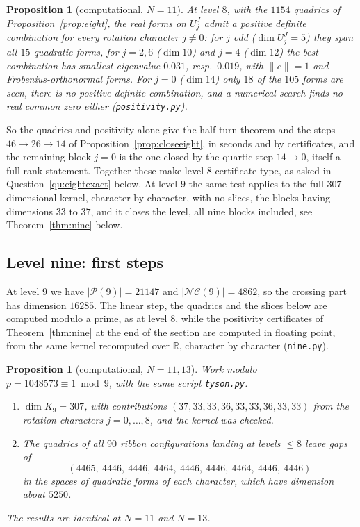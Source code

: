 \documentclass[11pt]{amsart}
\newtheorem{proposition}[theorem]{Proposition}
\theoremstyle{definition}
\theoremstyle{remark}
\theoremstyle{plain}
\numberwithin{equation}{section}
\numberwithin{table}{section}
\newcommand{\NC}{\mathcal{NC}}
\newcommand{\Pp}{\mathcal{P}}
\begin{document}
\begin{proposition}[computational, $N=11$]\label{prop:poseight}
At level $8$, with the $1154$ quadrics of Proposition~\ref{prop:eight}, the real forms on $U_j^J$ admit a positive definite combination for every rotation character $j\ne0$: for $j$ odd ($\dim U_j^J=5$) they span all $15$ quadratic forms, for $j=2,6$ ($\dim10$) and $j=4$ ($\dim12$) the best combination has smallest eigenvalue $0.031$, resp.\ $0.019$, with $\|c\|=1$ and Frobenius-orthonormal forms. For $j=0$ ($\dim14$) only $18$ of the $105$ forms are seen, there is no positive definite combination, and a numerical search finds no real common zero either (\texttt{positivity.py}).
\end{proposition}

So the quadrics and positivity alone give the half-turn theorem and the steps $46\to26\to14$ of Proposition~\ref{prop:closeeight}, in seconds and by certificates, and the remaining block $j=0$ is the one closed by the quartic step $14\to0$, itself a full-rank statement. Together these make level $8$ certificate-type, as asked in Question~\ref{qu:eightexact} below. At level $9$ the same test applies to the full $307$-dimensional kernel, character by character, with no slices, the blocks having dimensions $33$ to $37$, and it closes the level, all nine blocks included, see Theorem~\ref{thm:nine} below.

\subsection{Level nine: first steps}

At level $9$ we have $|\Pp(9)|=21147$ and $|\NC(9)|=4862$, so the crossing part has dimension $16285$. The linear step, the quadrics and the slices below are computed modulo a prime, as at level $8$, while the positivity certificates of Theorem~\ref{thm:nine} at the end of the section are computed in floating point, from the same kernel recomputed over $\mathbb R$, character by character (\texttt{nine.py}).

\begin{proposition}[computational, $N=11,13$]\label{prop:nine}
Work modulo $p=1048573\equiv1\bmod9$, with the same script \texttt{tyson.py}.
\begin{enumerate}
\item $\dim K_9=307$, with contributions $(37,33,33,36,33,33,36,33,33)$ from the rotation characters $j=0,\dots,8$, and the kernel was checked.
\item The quadrics of all $90$ ribbon configurations landing at levels $\le8$ leave gaps of
\[
(4465,\ 4446,\ 4446,\ 4464,\ 4446,\ 4446,\ 4464,\ 4446,\ 4446)
\]
in the spaces of quadratic forms of each character, which have dimension about $5250$.
\end{enumerate}
The results are identical at $N=11$ and $N=13$.
\end{proposition}
\end{document}
